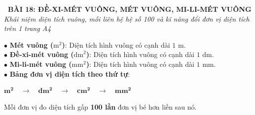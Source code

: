 \documentclass[14pt,a4paper,oneside]{extbook}
\begin{document}
\noindent
\begin{tcolorbox}[
  enhanced,
  colback=teal!8!white,
  colframe=teal!80!black,
  arc=3mm, boxrule=1pt,
  left=3mm, right=3mm, top=2mm, bottom=2mm,
  halign=center
]
  {\Large\bfseries\color{teal!90!black}\faBookmark\ BÀI 18: ĐỀ-XI-MÉT VUÔNG, MÉT VUÔNG, MI-LI-MÉT VUÔNG}\\[1.5pt]
  {\footnotesize\itshape\color{black!75} Khái niệm diện tích vuông, mối liên hệ hệ số 100 và kĩ năng đổi đơn vị diện tích trên 1 trang A4}
\end{tcolorbox}

\vspace{2mm}

\noindent
\begin{minipage}[t]{0.49\textwidth}
  \begin{tcolorbox}[
    enhanced,
    title={\footnotesize\bfseries\color{white}\faThLarge\ 1. Khái niệm đơn vị diện tích},
    colback=blue!2!white,
    colframe=blue!75!black,
    arc=2.5mm, boxrule=0.8pt, top=1.8mm, bottom=1.8mm, left=2mm, right=2mm
  ]
    \footnotesize
    $\bullet$ \textbf{Mét vuông ($\text{m}^2$)}: Diện tích hình vuông có cạnh dài $1\text{ m}$.\\
    $\bullet$ \textbf{Đề-xi-mét vuông ($\text{dm}^2$)}: Diện tích hình vuông có cạnh dài $1\text{ dm}$.\\
    $\bullet$ \textbf{Mi-li-mét vuông ($\text{mm}^2$)}: Diện tích hình vuông có cạnh dài $1\text{ mm}$.\\
    $\bullet$ \textbf{Bảng đơn vị diện tích theo thứ tự}:
    \begin{center}
      $\mathbf{m^2} \quad \rightarrow \quad \mathbf{dm^2} \quad \rightarrow \quad \mathbf{cm^2} \quad \rightarrow \quad \mathbf{mm^2}$
    \end{center}
    Mỗi đơn vị đo diện tích gấp \textbf{100 lần} đơn vị bé hơn liền sau nó.
  \end{tcolorbox}
\end{minipage}%
\hfill
\end{document}
